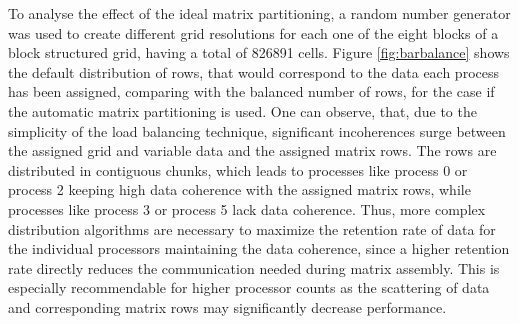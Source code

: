 To analyse the effect of the ideal matrix partitioning, a random number generator was used to create different grid resolutions for each one of the eight blocks of a block structured grid, having a total of 826891 cells. Figure \ref{fig:barbalance} shows the default distribution of rows, that would correspond to the data each process has been assigned, comparing with the balanced number of rows, for the case if the automatic matrix partitioning is used. One can observe, that, due to the simplicity of the load balancing technique, significant incoherences surge between the assigned grid and variable data and the assigned matrix rows. The rows are distributed in contiguous chunks, which leads to processes like process 0 or process 2 keeping high data coherence with the assigned matrix rows, while processes like process 3 or process 5 lack data coherence. Thus, more complex distribution algorithms are necessary to maximize the retention rate of data for the individual processors maintaining the data coherence, since a higher retention rate directly reduces the communication needed during matrix assembly. This is especially recommendable for higher processor counts as the scattering of data and corresponding matrix rows may significantly decrease performance.

